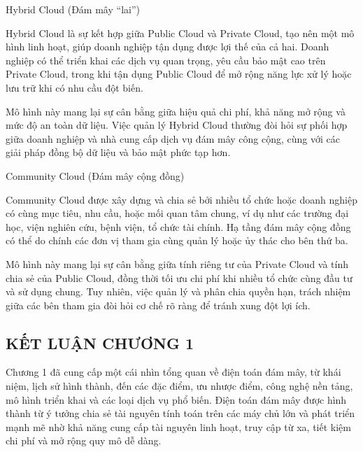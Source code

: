 \begin{myitem}
  \item Hybrid Cloud (Đám mây “lai”)  

  \hspace*{1cm}Hybrid Cloud là sự kết hợp giữa Public Cloud và Private Cloud, tạo nên một mô hình linh hoạt, giúp doanh nghiệp tận dụng được lợi thế của cả hai. Doanh nghiệp có thể triển khai các dịch vụ quan trọng, yêu cầu bảo mật cao trên Private Cloud, trong khi tận dụng Public Cloud để mở rộng năng lực xử lý hoặc lưu trữ khi có nhu cầu đột biến.  

  \hspace*{1cm}Mô hình này mang lại sự cân bằng giữa hiệu quả chi phí, khả năng mở rộng và mức độ an toàn dữ liệu. Việc quản lý Hybrid Cloud thường đòi hỏi sự phối hợp giữa doanh nghiệp và nhà cung cấp dịch vụ đám mây công cộng, cùng với các giải pháp đồng bộ dữ liệu và bảo mật phức tạp hơn.  

   \item Community Cloud (Đám mây cộng đồng) 

  \hspace*{1cm}Community Cloud được xây dựng và chia sẻ bởi nhiều tổ chức hoặc doanh nghiệp có cùng mục tiêu, nhu cầu, hoặc mối quan tâm chung, ví dụ như các trường đại học, viện nghiên cứu, bệnh viện, tổ chức tài chính. Hạ tầng đám mây cộng đồng có thể do chính các đơn vị tham gia cùng quản lý hoặc ủy thác cho bên thứ ba.
  
  \hspace*{1cm}Mô hình này mang lại sự cân bằng giữa tính riêng tư của Private Cloud và tính chia sẻ của Public Cloud, đồng thời tối ưu chi phí khi nhiều tổ chức cùng đầu tư và sử dụng chung. Tuy nhiên, việc quản lý và phân chia quyền hạn, trách nhiệm giữa các bên tham gia đòi hỏi cơ chế rõ ràng để tránh xung đột lợi ích.
\end{myitem}

\newpage
\subsection*{\centering KẾT LUẬN CHƯƠNG 1}
Chương 1 đã cung cấp một cái nhìn tổng quan về điện toán đám mây, từ khái niệm, lịch sử hình thành, đến các đặc điểm, ưu nhược điểm, công nghệ nền tảng, mô hình triển khai và các loại dịch vụ phổ biến. Điện toán đám mây được hình thành từ ý tưởng chia sẻ tài nguyên tính toán trên các máy chủ lớn và phát triển mạnh mẽ nhờ khả năng cung cấp tài nguyên linh hoạt, truy cập từ xa, tiết kiệm chi phí và mở rộng quy mô dễ dàng.

